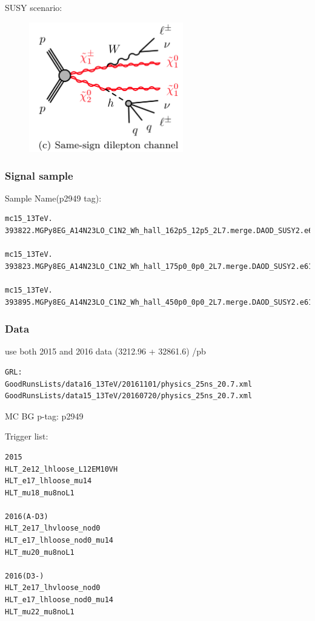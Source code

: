 \documentclass[mathserif,serif]{beamer}
\begin{document}
\begin{frame}
\small
SUSY scenario:\\
\begin{figure}
\includegraphics[width=0.6\textwidth]{data/photo/Wh.png}
\end{figure}
\end{frame}

\begin{frame}[fragile]
\frametitle{Signal sample}
\small
Sample Name(p2949 tag):
\tiny
\begin{verbatim}
mc15_13TeV.
393822.MGPy8EG_A14N23LO_C1N2_Wh_hall_162p5_12p5_2L7.merge.DAOD_SUSY2.e6153_a766_a821_r7676_p2949

mc15_13TeV.
393823.MGPy8EG_A14N23LO_C1N2_Wh_hall_175p0_0p0_2L7.merge.DAOD_SUSY2.e6153_a766_a821_r7676_p2949

mc15_13TeV.
393895.MGPy8EG_A14N23LO_C1N2_Wh_hall_450p0_0p0_2L7.merge.DAOD_SUSY2.e6153_a766_a821_r7676_p2949
\end{verbatim}
\end{frame}

\begin{frame}[fragile]
\frametitle{Data}
\small
use both 2015 and 2016 data (3212.96 + 32861.6) /pb
\tiny
\begin{verbatim}
GRL:
GoodRunsLists/data16_13TeV/20161101/physics_25ns_20.7.xml
GoodRunsLists/data15_13TeV/20160720/physics_25ns_20.7.xml
\end{verbatim}
\end{frame}

\begin{frame}{MC BG}
p-tag: p2949
\end{frame}

\begin{frame}[fragile]
\small
Trigger list:\\
\scriptsize
\begin{verbatim}
2015
HLT_2e12_lhloose_L12EM10VH
HLT_e17_lhloose_mu14
HLT_mu18_mu8noL1

2016(A-D3)
HLT_2e17_lhvloose_nod0
HLT_e17_lhloose_nod0_mu14
HLT_mu20_mu8noL1

2016(D3-)
HLT_2e17_lhvloose_nod0
HLT_e17_lhloose_nod0_mu14
HLT_mu22_mu8noL1
\end{verbatim}
\end{frame}
\end{document}
